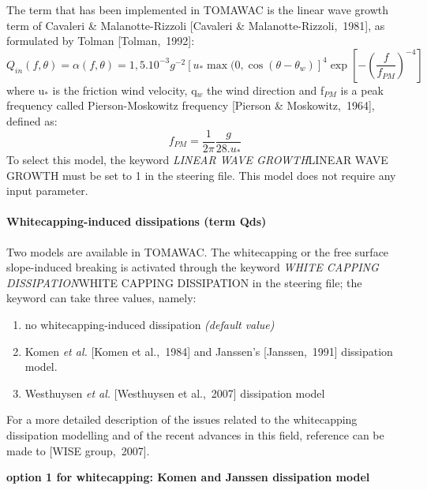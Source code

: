  The term that has been implemented in TOMAWAC is the linear wave growth term of Cavaleri \& Malanotte-Rizzoli [Cavaleri \& Malanotte-Rizzoli,~1981], as formulated by Tolman [Tolman,~1992]:
\begin{equation} \label{GrindEQ__4_35_}
Q_{in} (f,\theta )=\alpha (f,\theta )=1,5.10^{-3} g^{-2} \left[u_{*} \max (0,\cos \left(\theta -\theta _{w} \right)\right]^{4} \exp \left[-\left(\frac{f}{f_{PM} } \right)^{-4} \right]
\end{equation}
where u${}_{*}$ is the friction wind velocity, q${}_{w}$ the wind direction and f${}_{PM}$ is a peak frequency called Pierson-Moskowitz frequency [Pierson \& Moskowitz,~1964], defined as:
\begin{equation} \label{GrindEQ__4_36_}
f_{PM} =\frac{1}{2\pi } \frac{g}{28.u_{*} }
\end{equation}
To select this model, the keyword \textit{LINEAR WAVE GROWTH}LINEAR WAVE GROWTH must be set to 1 in the steering file. This model does not require any input parameter.




\paragraph{ Whitecapping-induced dissipations (term Qds)}

 Two models are available in TOMAWAC. The whitecapping or the free surface slope-induced breaking is activated through the keyword \textit{WHITE CAPPING DISSIPATION}WHITE CAPPING DISSIPATION\textit{ }in the steering file; the keyword can take three values, namely:

\begin{enumerate}
\item  no whitecapping-induced dissipation \textit{(default value)}

\item  Komen \textit{et al.} [Komen et al.,~1984] and Janssen's [Janssen,~1991] dissipation model.

\item  Westhuysen \textit{et al.} [Westhuysen et al.,~2007] dissipation model
\end{enumerate}

 For a more detailed description of the issues related to the whitecapping dissipation modelling and of the recent advances in this field, reference can be made to [WISE group,~2007].


{\bf  option 1 for whitecapping: Komen and Janssen dissipation model}

